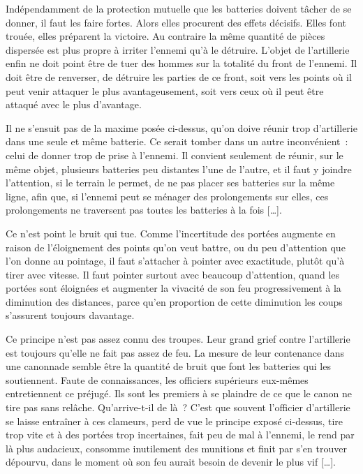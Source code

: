 \documentclass[french,twoside]{book} %
\begin{document}
Indépendamment de la protection mutuelle que les batteries doivent tâcher de se donner, il faut les faire fortes. Alors elles procurent des effets décisifs. Elles font trouée, elles préparent la victoire. Au contraire la même quantité de pièces dispersée est plus propre à irriter l’ennemi qu’à le détruire. L’objet de l’artillerie enfin ne doit point être de tuer des hommes sur la totalité du front de l’ennemi. Il doit être de renverser, de détruire les parties de ce front, soit vers les points où il peut venir attaquer le plus avantageusement, soit vers ceux où il peut être attaqué avec le plus d’avantage.\par
Il ne s’ensuit pas de la maxime posée ci-dessus, qu’on doive réunir trop d’artillerie dans une seule et même batterie. Ce serait tomber dans un autre inconvénient : celui de donner trop de prise à l’ennemi. Il convient seulement de réunir, sur le même objet, plusieurs batteries peu distantes l’une de l’autre, et il faut y joindre l’attention, si le terrain le permet, de ne pas placer ses batteries sur la même ligne, afin que, si l’ennemi peut se ménager des prolongements sur elles, ces prolongements ne traversent pas toutes les batteries à la fois […].\par
Ce n’est point le bruit qui tue. Comme l’incertitude des portées augmente en raison de l’éloignement des points qu’on veut battre, ou du peu d’attention que l’on donne au pointage, il faut s’attacher à pointer avec exactitude, plutôt qu’à tirer avec vitesse. Il faut pointer surtout avec beaucoup d’attention, quand les portées sont éloignées et augmenter la vivacité de son feu progressivement à la diminution des distances, parce qu’en proportion de cette diminution les coups s’assurent toujours davantage.\par
Ce principe n’est pas assez connu des troupes. Leur grand grief contre l’artillerie est toujours qu’elle ne fait pas assez de feu. La mesure de leur contenance dans une canonnade semble être la quantité de bruit que font les batteries qui les soutiennent. Faute de connaissances, les officiers supérieurs eux-mêmes entretiennent ce préjugé. Ils sont les premiers à se plaindre de ce que le canon ne tire pas sans relâche. Qu’arrive-t-il de là ? C’est que souvent l’officier d’artillerie se laisse entraîner à ces clameurs, perd de vue le principe exposé ci-dessus, tire trop vite et à des portées trop incertaines, fait peu de mal à l’ennemi, le rend par là plus audacieux, consomme inutilement des munitions et finit par s’en trouver dépourvu, dans le moment où son feu aurait besoin de devenir le plus vif […].\par
\end{document}
